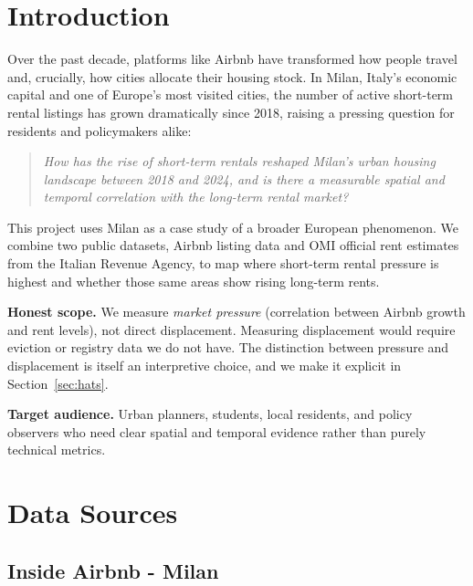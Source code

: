 \documentclass[11pt, a4paper]{article}
\begin{document}
\tableofcontents
\newpage

\section{Introduction}
\label{sec:intro}

Over the past decade, platforms like Airbnb have transformed how people travel and, crucially,
how cities allocate their housing stock. In Milan, Italy's economic capital and one of Europe's
most visited cities, the number of active short-term rental listings has grown dramatically
since 2018, raising a pressing question for residents and policymakers alike:

\begin{quote}\itshape
  How has the rise of short-term rentals reshaped Milan's urban housing landscape between 2018
  and 2024, and is there a measurable spatial and temporal correlation with the long-term
  rental market?
\end{quote}

This project uses Milan as a case study of a broader European phenomenon. We combine two public
datasets, Airbnb listing data and OMI official rent estimates from the Italian Revenue Agency,
to map where short-term rental pressure is highest and whether those same areas show rising
long-term rents.

\smallskip
\noindent\textbf{Honest scope.}
We measure \emph{market pressure} (correlation between Airbnb growth and rent levels), not
direct displacement. Measuring displacement would require eviction or registry data we do not
have. The distinction between pressure and displacement is itself an interpretive choice, and
we make it explicit in Section~\ref{sec:hats}.

\noindent\textbf{Target audience.}
Urban planners, students, local residents, and policy observers who need clear spatial and
temporal evidence rather than purely technical metrics.

\section{Data Sources}
\label{sec:data}

\subsection{Inside Airbnb - Milan}
\end{document}
